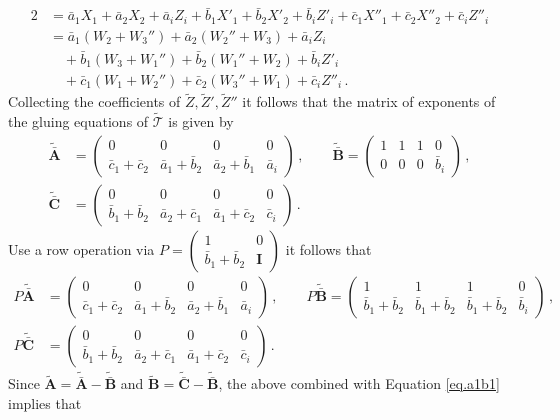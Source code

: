 \documentclass[12pt]{amsart}
\theoremstyle{definition}
\def\calT{\mathcal T}
\newcommand{\mb}{\mathbf}
\newcommand{\wt}{\widetilde}
\numberwithin{equation}{section}
\begin{document}
\begin{align*}
2 &= \bar a_1 X_1 + \bar a_2 X_2 + \bar a_i Z_i 
+ \bar b_1 X'_1 + \bar b_2 X'_2 + \bar b_i Z'_i +
\bar c_1 X''_1 + \bar c_2 X''_2 + \bar c_i Z''_i \\
&= \bar a_1 (W_2+W_3'') + \bar a_2 ( W_2''+W_3) + \bar a_i Z_i \\
&\quad + \bar b_1 (W_3+W_1'') + \bar b_2 (W_1''+W_2) + \bar b_i Z'_i  \\
&\quad + \bar c_1(W_1+W_2'') + \bar c_2 (W_3''+W_1) + \bar c_i Z''_i \,.
\end{align*}
Collecting the coefficients of $\tilde Z, \tilde Z', \tilde Z''$ it
follows that the matrix of exponents of the gluing equations of $\wt{\calT}$
is given by
\begin{align*}
\wt {\bar{\mb A}} 
& = \begin{pmatrix} 0 & 0 & 0  & 0 \\ 
\bar c_1+\bar c_2 & \bar a_1 + \bar b_2 & \bar a_2 + \bar b_1 & \bar a_i 
\end{pmatrix}\,, \qquad
\wt {\bar{\mb B}}
=\begin{pmatrix} 1 & 1 & 1 & 0 \\ 
0 & 0 & 0 & \bar b_i 
\end{pmatrix}\,, 
\\
\wt {\bar{\mb C}}
&=\begin{pmatrix} 0 & 0 & 0 & 0 \\ 
\bar b_1+\bar b_2 & \bar a_2+\bar c_1 & \bar a_1+\bar c_2 & \bar c_i 
\end{pmatrix} \,.
\end{align*}
Use a row operation via
$P= \begin{pmatrix} 1 & 0 \\ \bar b_1 + \bar b_2 & \mb I \end{pmatrix}$
it follows that
\begin{align*}
P \wt {\bar{\mb A}} 
& = \begin{pmatrix} 0 & 0 & 0  & 0 \\ 
\bar c_1+\bar c_2 & \bar a_1 + \bar b_2 & \bar a_2 + \bar b_1 & \bar a_i 
\end{pmatrix}\,, \qquad
P \wt {\bar{\mb B}}
=\begin{pmatrix} 1 & 1 & 1 & 0 \\ 
\bar b_1+\bar b_2 & \bar b_1+\bar b_2 & \bar b_1+\bar b_2 & \bar b_i 
\end{pmatrix}\,, 
\\
P \wt {\bar{\mb C}}
&=\begin{pmatrix} 0 & 0 & 0 & 0 \\ 
\bar b_1+\bar b_2 & \bar a_2+\bar c_1 & \bar a_1+\bar c_2 & \bar c_i 
\end{pmatrix} \,.
\end{align*}
Since $\wt{\mb A} =\wt{ \bar{\mb A}} - \wt{\bar{\mb B}}$ and 
$\wt{\mb B} =\wt{ \bar{\mb C}} -\wt{ \bar{\mb B}}$, the above combined
with Equation \eqref{eq.a1b1} implies that
\end{document}
